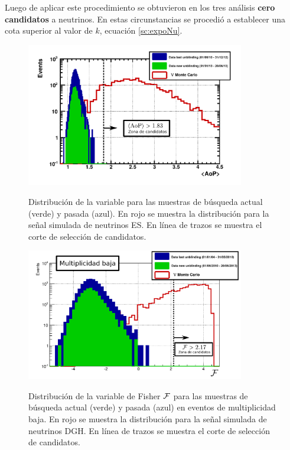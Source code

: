 	Luego de aplicar este procedimiento se obtuvieron en los tres an\'alisis \textbf{cero candidatos} a neutrinos.
	En estas circunstancias se procedi\'o a establecer una cota superior al valor de $k$,  ecuaci\'on \ref{sc:expoNu}.
	\begin{figure}[ht!]
		\begin{center}
			\includegraphics[width=0.85\textwidth]{fig/resultadosAuger/Unblinding_ES_200613_mod}\\
			\caption{\label{fig:unblindingES}
			Distribuci\'on de la variable \aop{} para las muestras de b\'usqueda actual (verde) y pasada (azul). En rojo se muestra la distribuci\'on para la se\~nal simulada de neutrinos ES.
			En l\'inea de trazos se muestra el corte de selecci\'on de candidatos.
			}
		\end{center}
	\end{figure}
	\begin{figure}[ht!]
		\begin{center}
			\includegraphics[width=0.85\textwidth]{fig/resultadosAuger/DGH_Retrining_May2012_2_low_Nor_mod}\\
			\caption{\label{fig:unblindingDGHL}
			Distribuci\'on de la variable de Fisher $\cal F$ para las muestras de b\'usqueda actual (verde) y pasada (azul) en eventos de multiplicidad baja. En rojo se muestra la distribuci\'on para la se\~nal simulada de neutrinos DGH.
			En l\'inea de trazos se muestra el corte de selecci\'on de candidatos.
			}
		\end{center}
	\end{figure}
